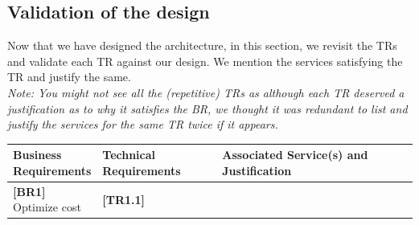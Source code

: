 \documentclass{article}
\begin{document}
\subsection{Validation of the design}
 Now that we have designed the architecture, in this section, we revisit the TRs and validate each TR against our design. We mention the services satisfying the TR and justify the same. \\
 \textit{Note: You might not see all the (repetitive) TRs as although each TR deserved a justification as to why it satisfies the BR, we thought it was redundant to list and justify the services for the same TR twice if it appears. }
\begin{table}[H]
    \centering
    \def\arraystretch{1.75}
    \begin{tabular}{|p{0.2\linewidth}| p{0.3\linewidth} | p{0.5\linewidth} |} \hline 
         \textbf{Business Requirements} &  \textbf{Technical Requirements} & \textbf{Associated Service(s) and Justification}\\ \hline 
         \textbf{[BR1]} Optimize cost &  \textbf{[TR1.1]} 
         

\end{tabular}
\end{table}
\end{document}
